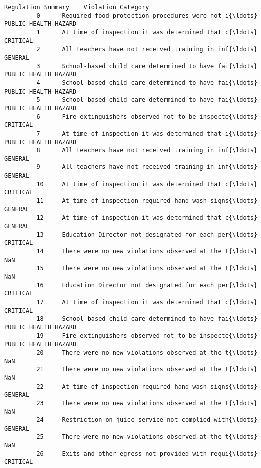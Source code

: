 \documentclass[11pt]{article}
\begin{document}
\begin{Verbatim}[commandchars=\\\{\}]
                                               Regulation Summary    Violation Category  
         0      Required food protection procedures were not i{\ldots}  PUBLIC HEALTH HAZARD  
         1      At time of inspection it was determined that c{\ldots}              CRITICAL  
         2      All teachers have not received training in inf{\ldots}               GENERAL  
         3      School-based child care determined to have fai{\ldots}  PUBLIC HEALTH HAZARD  
         4      School-based child care determined to have fai{\ldots}  PUBLIC HEALTH HAZARD  
         5      School-based child care determined to have fai{\ldots}  PUBLIC HEALTH HAZARD  
         6      Fire extinguishers observed not to be inspecte{\ldots}              CRITICAL  
         7      At time of inspection it was determined that i{\ldots}  PUBLIC HEALTH HAZARD  
         8      All teachers have not received training in inf{\ldots}               GENERAL  
         9      All teachers have not received training in inf{\ldots}               GENERAL  
         10     At time of inspection it was determined that c{\ldots}              CRITICAL  
         11     At time of inspection required hand wash signs{\ldots}               GENERAL  
         12     At time of inspection it was determined that c{\ldots}               GENERAL  
         13     Education Director not designated for each per{\ldots}              CRITICAL  
         14     There were no new violations observed at the t{\ldots}                   NaN  
         15     There were no new violations observed at the t{\ldots}                   NaN  
         16     Education Director not designated for each per{\ldots}              CRITICAL  
         17     At time of inspection it was determined that c{\ldots}              CRITICAL  
         18     School-based child care determined to have fai{\ldots}  PUBLIC HEALTH HAZARD  
         19     Fire extinguishers observed not to be inspecte{\ldots}  PUBLIC HEALTH HAZARD  
         20     There were no new violations observed at the t{\ldots}                   NaN  
         21     There were no new violations observed at the t{\ldots}                   NaN  
         22     At time of inspection required hand wash signs{\ldots}               GENERAL  
         23     There were no new violations observed at the t{\ldots}                   NaN  
         24     Restriction on juice service not complied with{\ldots}               GENERAL  
         25     There were no new violations observed at the t{\ldots}                   NaN  
         26     Exits and other egress not provided with requi{\ldots}              CRITICAL  

\end{Verbatim}
\end{document}
